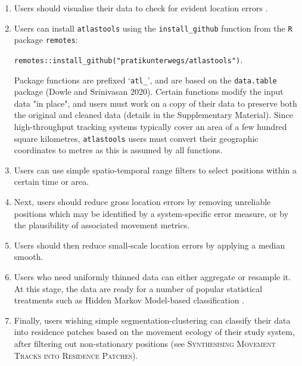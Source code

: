 \documentclass[10pt,paper=a4,headings=standardclasses
]{scrartcl}
\begin{document}
\begin{enumerate}
    
    \item Users should visualise their data to check for evident location errors \citep{slingsby2016}.
    \item Users can install \texttt{atlastools} using the \texttt{install\_github} function from the \texttt{R} package \texttt{remotes}:
    
    \texttt{remotes::install\_github("pratikunterwegs/atlastools")}.
    
    Package functions are prefixed `\texttt{atl\_}', and are based on the \texttt{data.table} package (Dowle and Srinivasan 2020).
    Certain functions modify the input data "in place", and users must work on a copy of their data to preserve both the original and cleaned data (details in the Supplementary Material).
    Since high-throughput tracking systems typically cover an area of a few hundred square kilometres, \texttt{atlastools} users must convert their geographic coordinates to metres as this is assumed by all functions.
    \item Users can use simple spatio-temporal range filters to select positions within a certain time or area.
    \item Next, users should reduce gross location errors by removing unreliable positions which may be identified by a system-specific error measure, or by the plausibility of associated movement metrics.
    \item Users should then reduce small-scale location errors by applying a median smooth.
    \item Users who need uniformly thinned data can either aggregate or resample it.
    At this stage, the data are ready for a number of popular statistical treatments such as Hidden Markov Model-based classification \citep{michelot2016,langrock2012}.
    \item Finally, users wishing simple segmentation-clustering can classify their data into residence patches based on the movement ecology of their study system, after filtering out non-stationary positions (see \textsc{Synthesising Movement Tracks into Residence Patches}).
    
\end{enumerate}
\end{document}

